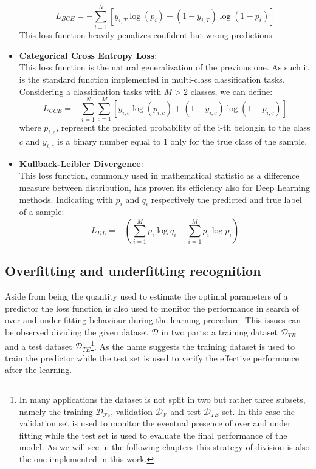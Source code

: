 \begin{itemize}
    \begin{equation}
        L_{BCE}= -\sum_{i=1}^N\left[ y_{i,T}\log(p_i)+
        \left(1- y_{i,T}\right)\log(1-p_i)\right]
    \end{equation}
    This loss function heavily penalizes confident but wrong predictions. 
\item \textbf{Categorical Cross Entropy Loss}:\\
    This loss function is the natural generalization of the previous one. As such it is the standard function implemented in multi-class classification tasks. Considering a classification tasks with $M>2$ classes, we can define: 
    \begin{equation}
        L_{CCE} = -\sum_{i=1}^N \sum_{c=1}^M  \left[
        y_{i,c}\log(p_{i,c}) + (1-y_{i,c})\log(1-p_{i,c})
        \right]
    \end{equation}
    where $p_{i,c}$, represent the predicted probability of the i-th belongin to the class $c$ and $y_{i,c}$ is a binary number equal to 1 only for the true class of the sample.
\item \textbf{Kullback-Leibler Divergence}:\\
   This loss function, commonly used in mathematical statistic as a difference measure between distribution, has proven its efficiency also for Deep Learning methods\cite{kullbackeff, kullbackeff2}. Indicating with $p_i$ and $q_i$ respectively the predicted and true label of a sample:
    \begin{equation}
        L_{KL} = - \left( \sum_{i=1}^{M} p_{i} \log{q_{i}} - \sum_{i=1}^{M} p_{i} \log{p_{i}} \right)
    \end{equation}
    
\end{itemize}


\subsection{Overfitting and underfitting recognition} \label{fit_over_under}

Aside from being the quantity used to estimate the optimal parameters of a predictor the loss function is also used to monitor the performance in search of over and under fitting behaviour during the learning procedure. 
This issues can be observed dividing the given dataset $\mathcal{D}$ in two parts: a training dataset $\mathcal{D}_{TR}$ and a test dataset $\mathcal{D}_{TE}$\footnote{In many applications the dataset is not split in two but rather three subsets, namely the training $\mathcal{D_{Tr}}$, validation $\mathcal{D_{V}}$ and test $\mathcal{D}_{TE}$ set. In this case the validation set is used to monitor the eventual presence of over and under fitting while the test set is used to evaluate the final performance of the model. As we will see in the following chapters this strategy of division is also the one implemented in this work.}. As the name suggests the training dataset is used to train the predictor while the test set is used to verify the effective performance after the learning.

